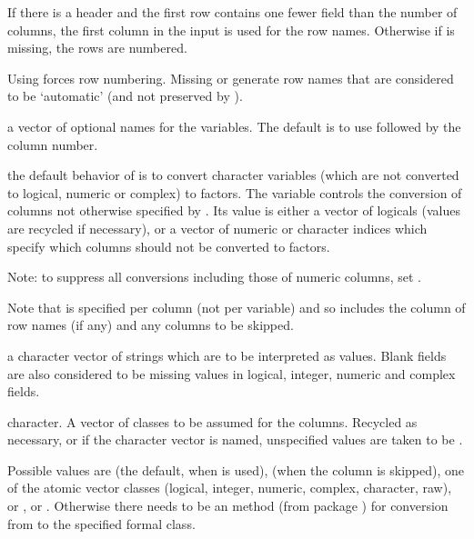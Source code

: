 \begin{Arguments}
\begin{ldescription}
If there is a header and the first row contains one fewer field than
the number of columns, the first column in the input is used for the
row names.  Otherwise if  is missing, the rows are
numbered.

Using  forces row numbering. Missing or
  generate row names that are considered
to be `automatic' (and not preserved by ).


\item[\code{col.names}] a vector of optional names for the variables.
The default is to use  followed by the column number.

\item[\code{as.is}] the default behavior of  is to convert
character variables (which are not converted to logical, numeric or
complex) to factors.  The variable  controls the
conversion of columns not otherwise specified by .
Its value is either a vector of logicals (values are recycled if
necessary), or a vector of numeric or character indices which
specify which columns should not be converted to factors.

Note: to suppress all conversions including those of numeric
columns, set .

Note that  is specified per column (not per
variable) and so includes the column of row names (if any) and any
columns to be skipped.


\item[\code{na.strings}] a character vector of strings which are to be
interpreted as  values.  Blank fields are also
considered to be missing values in logical, integer, numeric and
complex fields.

\item[\code{colClasses}] character.  A vector of classes to be assumed for
the columns.  Recycled as necessary, or if the character vector is
named, unspecified values are taken to be .

Possible values are  (the default, when
 is used),  (when the column
is skipped), one of the atomic vector classes (logical, integer,
numeric, complex, character, raw), or , 
or .  Otherwise there needs to be an 
method (from package ) for conversion from
 to the specified formal class.


\end{ldescription}
\end{Arguments}
